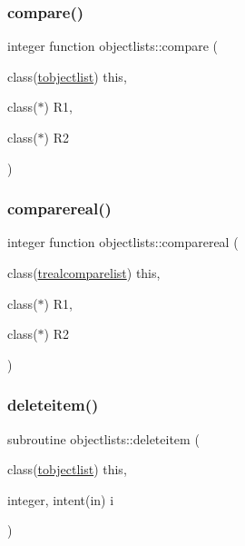 \subsubsection{\texorpdfstring{compare()}{compare()}}
{\footnotesize\ttfamily integer function objectlists\+::compare (\begin{DoxyParamCaption}\item[{class(\mbox{\hyperlink{structobjectlists_1_1tobjectlist}{tobjectlist}})}]{this,  }\item[{class($\ast$)}]{R1,  }\item[{class($\ast$)}]{R2 }\end{DoxyParamCaption})\hspace{0.3cm}{\ttfamily [private]}}

\mbox{\label{namespaceobjectlists_ac923fbeb64f1caebb0cd581988e43978}} 
\subsubsection{\texorpdfstring{comparereal()}{comparereal()}}
{\footnotesize\ttfamily integer function objectlists\+::comparereal (\begin{DoxyParamCaption}\item[{class(\mbox{\hyperlink{structobjectlists_1_1trealcomparelist}{trealcomparelist}})}]{this,  }\item[{class($\ast$)}]{R1,  }\item[{class($\ast$)}]{R2 }\end{DoxyParamCaption})\hspace{0.3cm}{\ttfamily [private]}}

\mbox{\label{namespaceobjectlists_a8110526567f8e6cf9fda3be8654005ad}} 
\subsubsection{\texorpdfstring{deleteitem()}{deleteitem()}}
{\footnotesize\ttfamily subroutine objectlists\+::deleteitem (\begin{DoxyParamCaption}\item[{class(\mbox{\hyperlink{structobjectlists_1_1tobjectlist}{tobjectlist}})}]{this,  }\item[{integer, intent(in)}]{i }\end{DoxyParamCaption})\hspace{0.3cm}{\ttfamily [private]}}

